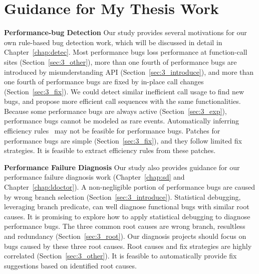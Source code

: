 \section{Guidance for My Thesis Work}
\label{sec:3_own}

{\bf Performance-bug Detection}
Our study provides several motivations for our own rule-based bug detection work, 
which will be discussed in detail in Chapter~\ref{chap:detec}. 
Most performance bugs loss performance at function-call sites (Section~\ref{sec:3_other}), 
more than one fourth of performance bugs are introduced by misunderstanding API (Section~\ref{sec:3_introduce}), 
and more than one fourth of performance bugs are fixed by in-place call changes (Section~\ref{sec:3_fix}). 
We could detect similar inefficient call usage to find new bugs, and propose more efficient call sequences with the same functionalities.
Because some performance bugs are always active (Section~\ref{sec:3_exp}), 
performance bugs cannot be modeled as rare events.
Automatically inferring efficiency rules~\citep{engler01bugs} may not be feasible for performance bugs. 
Patches for performance bugs are simple (Section~\ref{sec:3_fix}), and they follow limited fix strategies. 
It is feasible to extract efficiency rules from these patches. 

{\bf Performance Failure Diagnosis}
Our study also provides guidance for our performance failure diagnosis work (Chapter~\ref{chap:sd} and Chapter~\ref{chap:ldoctor}). 
A non-negligible portion of performance bugs are caused by wrong branch selection (Section~\ref{sec:3_introduce}). 
Statistical debugging, leveraging branch predicate, can well diagnose functional bugs with similar root causes. 
It is promising to explore how to apply statistical debugging to diagnose performance bugs. 
The three common root causes are wrong branch, resultless and redundancy (Section~\ref{sec:3_root}). 
Our diagnosis projects should focus on bugs caused by these three root causes. 
Root causes and fix strategies are highly correlated (Section~\ref{sec:3_other}).
It is feasible to automatically provide fix suggestions based on identified root causes. 


